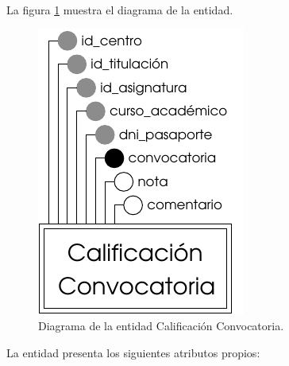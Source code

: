 \begin{description}
   \item[Diagrama] La figura \ref{diagramaCalConv} muestra el diagrama de la
   entidad.
   \item \begin{figure}[!ht]
            \begin{center}
            \includegraphics[]{07.Modelo_Entidad-Interrelacion/7.2.Analisis_Entidades/diagramas/cal_conv.pdf}
            \caption{Diagrama de la entidad Calificación Convocatoria.}
            \label{diagramaCalConv}
            \end{center}
         \end{figure}

   \item[Descripción de los atributos propios] La entidad presenta los
   siguientes atributos propios:


\end{description}
